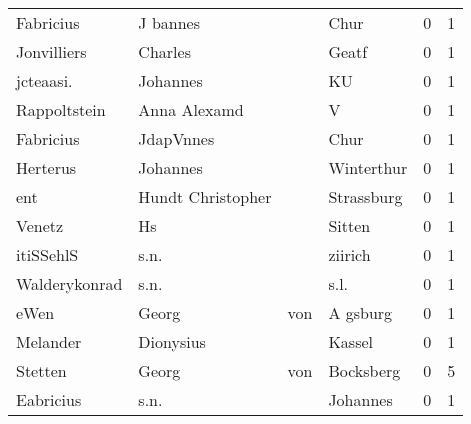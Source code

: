 \begin{center}
\begin{tiny}
\begin{longtabu}{llllrr}
                Fabricius &                           J bannes &             &                                        Chur &          0 &         1 \\
              Jonvilliers &                            Charles &             &                                       Geatf &          0 &         1 \\
                jcteaasi. &                           Johannes &             &                                          KU &          0 &         1 \\
             Rappoltstein &                       Anna Alexamd &             &                                           V &          0 &         1 \\
                Fabricius &                          JdapVnnes &             &                                        Chur &          0 &         1 \\
                 Herterus &                           Johannes &             &                                  Winterthur &          0 &         1 \\
                      ent &                  Hundt Christopher &             &                                  Strassburg &          0 &         1 \\
                   Venetz &                                 Hs &             &                                      Sitten &          0 &         1 \\
                itiSSehlS &                               s.n. &             &                                     ziirich &          0 &         1 \\
            Walderykonrad &                               s.n. &             &                                        s.l. &          0 &         1 \\
                     eWen &                              Georg &         von &                                    A gsburg &          0 &         1 \\
                 Melander &                          Dionysius &             &                                      Kassel &          0 &         1 \\
                  Stetten &                              Georg &         von &                                   Bocksberg &          0 &         5 \\
                Eabricius &                               s.n. &             &                                    Johannes &          0 &         1 \\

\end{longtabu}
\end{tiny}
\end{center}
